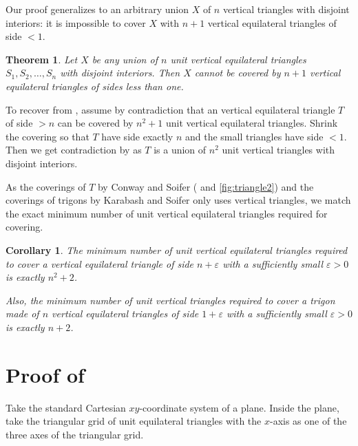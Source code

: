 \documentclass[a4paper]{amsart}
\theoremstyle{plain}
\newtheorem{theorem}{Theorem}
\newtheorem{corollary}{Corollary}
\theoremstyle{definition}
\begin{document}
Our proof generalizes to an arbitrary union \(X\) of \(n\) vertical triangles with disjoint interiors: it is impossible to cover \(X\) with \(n + 1\) vertical equilateral triangles of side \(< 1\).

\begin{theorem}

Let \(X\) be any union of \(n\) unit vertical equilateral triangles \(S_1, S_2, \dots, S_n\) with disjoint interiors. Then \(X\) cannot be covered by \(n + 1\) vertical equilateral triangles of sides less than one.

\label{thm:triangle-cover}
\end{theorem}

To recover  from , assume by contradiction that an vertical equilateral triangle \(T\) of side \(> n\) can be covered by \(n^2 + 1\) unit vertical equilateral triangles. Shrink the covering so that \(T\) have side exactly \(n\) and the small triangles have side \(< 1\). Then we get contradiction by  as \(T\) is a union of \(n^2\) unit vertical triangles with disjoint interiors.

As the coverings of \(T\) by Conway and Soifer ( and \ref{fig:triangle2}) and the coverings of trigons by Karabash and Soifer only uses vertical triangles,
we match the exact minimum number of unit vertical equilateral triangles required for covering.

\begin{corollary}

The minimum number of unit vertical equilateral triangles required to cover a vertical equilateral triangle of side \(n + \varepsilon\) with a sufficiently small $\varepsilon > 0$ is exactly \(n^2+2\).

Also, the minimum number of unit vertical triangles required to cover a trigon made of \(n\) vertical equilateral triangles of side \(1 + \varepsilon\) with a sufficiently small $\varepsilon > 0$ is exactly \(n + 2\).

\label{cor:triangle-cover-number}
\end{corollary}

\section{Proof of }

Take the standard Cartesian \(xy\)-coordinate system of a plane.
Inside the plane, take the triangular grid of unit equilateral triangles with the \(x\)-axis as one of the three axes of the triangular grid.
\end{document}
